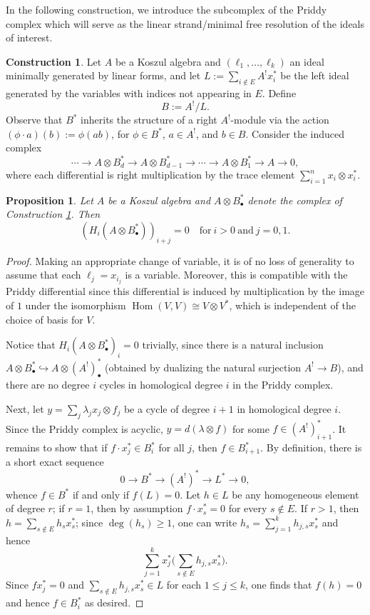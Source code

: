 \documentclass[10pt]{amsart}
\newtheorem{prop}[theorem]{Proposition}
\theoremstyle{definition}
\newtheorem{construction}[theorem]{Construction}
\theoremstyle{remark}
\newtheorem{the context}[theorem]{The Context}
\numberwithin{equation}{theorem}
\numberwithin{equation}{section}
\renewcommand{\geq}{\geqslant}
\renewcommand{\leq}{\leqslant}
\renewcommand{\hom}{\Hom}
\newcommand{\Hom}{\operatorname{Hom}}
\begin{document}
In the following construction, we introduce the subcomplex of the Priddy complex which will serve as the linear strand/minimal free resolution of the ideals of interest.

\begin{construction}\label{cons:subPriddy}
Let $A$ be a Koszul algebra and $(\ell_1 , \dots , \ell_k)$ an ideal minimally generated by linear forms, and let $L := \sum_{i \notin E} A^! x_i^*$ be the left ideal generated by the variables with indices not appearing in $E$. Define
$$B := A^!/L.$$
Observe that $B^*$ inherits the structure of a right $A^!$-module via the action $(\phi \cdot a) (b) := \phi (a b)$, for $\phi \in B^*$, $a \in A^!$, and $b \in B$. Consider the induced complex
$$\cdots \to A \otimes B^*_d \to A \otimes B^*_{d-1} \to \cdots \to A \otimes B^*_1 \to A \to 0,$$
where each differential is right multiplication by the trace element $\sum_{i =1}^n x_i \otimes x_{i}^*$. 
\end{construction}

\begin{prop}\label{prop:subPriddyCx}
Let $A$ be a Koszul algebra and $A \otimes B^*_\bullet$ denote the complex of Construction \ref{cons:subPriddy}. Then
$$(H_i (A \otimes B^*_\bullet))_{i+j} = 0 \quad \textrm{for} \ i>0 \ \textrm{and} \ j=0, 1.$$
\end{prop}

\begin{proof}
Making an appropriate change of variable, it is of no loss of generality to assume that each $\ell_j = x_{i_j}$ is a variable. Moreover, this is compatible with the Priddy differential since this differential is induced by multiplication by the image of $1$ under the isomorphism $\hom (V,V) \cong V \otimes V^*$, which is independent of the choice of basis for $V$.

Notice that $H_i(A \otimes B_\bullet^*)_{i} = 0$ trivially, since there is a natural inclusion $A \otimes B_\bullet^* \hookrightarrow A \otimes (A^!)^*_\bullet$ (obtained by dualizing the natural surjection $A^! \to B$), and there are no degree $i$ cycles in homological degree $i$ in the Priddy complex. 

Next, let $ y = \sum_j \lambda_j x_j \otimes f_j$ be a cycle of degree $i+1$ in homological degree $i$. Since the Priddy complex is acyclic, $y = d(\lambda \otimes f)$ for some $f \in (A^!)^*_{i+1}$. It remains to show that if $ f \cdot x_j^* \in B^*_{i}$ for all $j$, then $f \in B^*_{i+1}$. By definition, there is a short exact sequence
$$0 \to B^* \to (A^!)^* \to L^* \to 0,$$
whence $f \in B^*$ if and only if $f(L) = 0$. Let $h \in L$ be any homogeneous element of degree $r$; if $r = 1$, then by assumption $f \cdot x_s^* = 0$ for every $s \notin E$. If $r>1$, then $h = \sum_{s \notin E} h_s x_s^*$; since $\deg (h_s) \geq 1$, one can write $h_s = \sum_{j=1}^k h_{j,s} x_s^*$ and hence 
$$ \sum_{j=1}^k x_j^* \Big( \sum_{s \notin E} h_{j,s} x_s^* \Big).$$
Since $f x_j^* = 0$ and $\sum_{s \notin E} h_{j,s} x_s^* \in L$ for each $1 \leq j \leq k$, one finds that $f(h) = 0$ and hence $f \in B^*_i$ as desired.
\end{proof}
\end{document}
